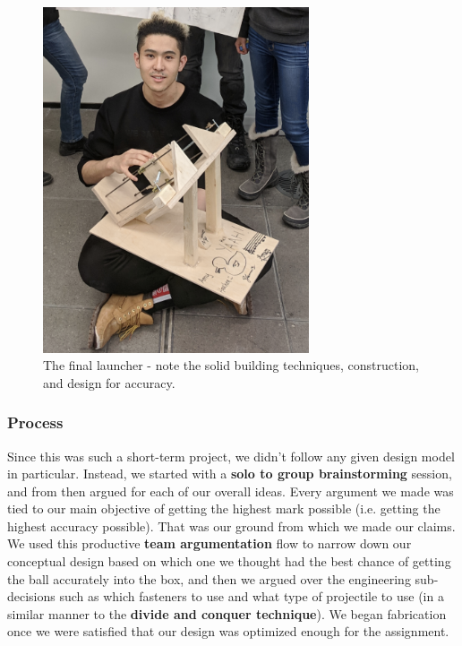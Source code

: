 \documentclass[a4paper,12pt]{article}
\begin{document}
\begin{figure}[H]
\centering
\includegraphics[width=0.7\textwidth]{img/image007.png}
\caption{The final launcher - note the solid building techniques, construction, and design for accuracy.}
\label{}
\end{figure}

\subsubsection{Process}
Since this was such a short-term project, we didn’t follow any given design model in particular. Instead, we started with a \textbf{solo to group brainstorming} session, and from then argued for each of our overall ideas. Every argument we made was tied to our main objective of getting the highest mark possible (i.e. getting the highest accuracy possible). That was our ground from which we made our claims. We used this productive \textbf{team argumentation} flow to narrow down our conceptual design based on which one we thought had the best chance of getting the ball accurately into the box, and then we argued over the engineering sub-decisions such as which fasteners to use and what type of projectile to use (in a similar manner to the \textbf{divide and conquer technique}). We began fabrication once we were satisfied that our design was optimized enough for the assignment.
\end{document}
